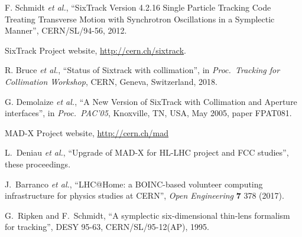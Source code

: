 \documentclass[a4paper,
              ]{jacow}
\begin{document}
\begin{thebibliography}{99}


F. Schmidt {\it et al.},
``SixTrack Version 4.2.16 Single Particle Tracking Code Treating Transverse Motion with Synchrotron Oscillations in a Symplectic Manner'',
CERN/SL/94-56, 2012.

SixTrack Project website,
\url{http://cern.ch/sixtrack}.

R. Bruce {\it et al.},
``Status of Sixtrack with collimation'',
in \emph{Proc.~Tracking for Collimation Workshop}, CERN, Geneva, Switzerland, 2018.


G. Demolaize {\it et al.}, ``A New Version of SixTrack with Collimation and Aperture interfaces'', in {\it Proc.~PAC'05}, Knoxville, TN, USA, May 2005, paper FPAT081.

MAD-X Project website, \url{http://cern.ch/mad}


L.~Deniau {\it et al.},
``Upgrade of MAD-X for HL-LHC project and FCC studies'',
these proceedings.

J.~Barranco \emph{et al.},
``LHC@Home: a BOINC-based volunteer computing infrastructure for physics studies at CERN'',
{\it Open Engineering} {\bf 7} 378 (2017).

G.~Ripken and F.~Schmidt,
``A symplectic six-dimensional thin-lens formalism for tracking'',
DESY 95-63, CERN/SL/95-12(AP), 1995.


\end{thebibliography}
\end{document}
